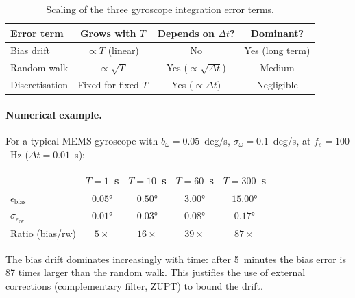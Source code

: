 \begin{table}[h]
  \centering
  \caption{Scaling of the three gyroscope integration error terms.}
  \label{tab:app:error_comparison}
  \begin{tabular}{@{}lccc@{}}
    \toprule
    \textbf{Error term}
      & \textbf{Grows with $T$}
      & \textbf{Depends on $\Delta t$?}
      & \textbf{Dominant?} \\
    \midrule
    Bias drift
      & $\propto T$ (linear)
      & No
      & Yes (long term) \\
    Random walk
      & $\propto \sqrt{T}$
      & Yes ($\propto \sqrt{\Delta t}$)
      & Medium \\
    Discretisation
      & Fixed for fixed $T$
      & Yes ($\propto \Delta t$)
      & Negligible \\
    \bottomrule
  \end{tabular}
\end{table}

\paragraph{Numerical example.}
For a typical MEMS gyroscope with $b_\omega = 0.05$~deg/s,
$\sigma_\omega = 0.1$~deg/s, at $f_s = 100$~Hz ($\Delta t = 0.01$~s):

\begin{center}
\begin{tabular}{@{}lcccc@{}}
  \toprule
  & $T = 1$~s & $T = 10$~s & $T = 60$~s & $T = 300$~s \\
  \midrule
  $\epsilon_\text{bias}$
    & $0.05°$ & $0.50°$ & $3.00°$ & $15.00°$ \\
  $\sigma_{\epsilon_\text{rw}}$
    & $0.01°$ & $0.03°$ & $0.08°$ & $0.17°$ \\
  Ratio (bias/rw)
    & $5\times$ & $16\times$ & $39\times$ & $87\times$ \\
  \bottomrule
\end{tabular}
\end{center}

\noindent The bias drift dominates increasingly with time: after 5~minutes the
bias error is 87 times larger than the random walk. This justifies the use of
external corrections (complementary filter, ZUPT) to bound the drift.
